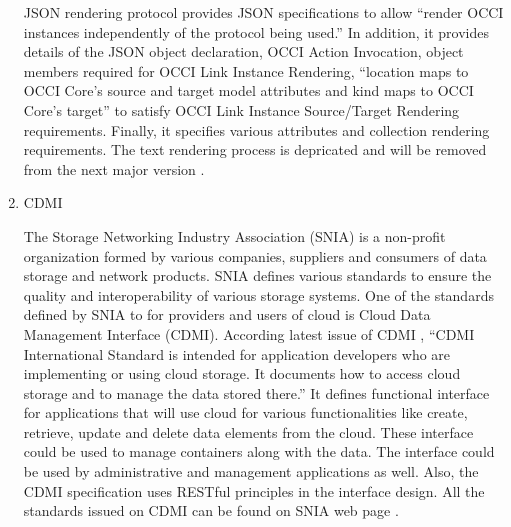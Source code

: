 \begin{enumerate}
JSON rendering  \label{\detokenize{i524/technologies:id565}}{\hyperref[\detokenize{i524/technologies:nyren-feldhaus-parak-2016}]{\sphinxcrossref{{[}485{]}}}} protocol provides
JSON specifications to allow ``render OCCI instances
independently of the protocol being used.'' In addition, it
provides details of the JSON object declaration, OCCI Action
Invocation, object members required for OCCI Link Instance
Rendering, ``location maps to OCCI Core's source and target
model attributes and kind maps to OCCI Core's target'' to
satisfy OCCI Link Instance Source/Target Rendering requirements.
Finally, it specifies various attributes and collection
rendering requirements.
The text rendering process is depricated and will be
removed from the next major version  \label{\detokenize{i524/technologies:id566}}{\hyperref[\detokenize{i524/technologies:edmonds-metsch-2016}]{\sphinxcrossref{{[}486{]}}}}.

\item {} 
CDMI

The Storage Networking Industry Association (SNIA)
\label{\detokenize{i524/technologies:id567}}{\hyperref[\detokenize{i524/technologies:www-sniawebsite}]{\sphinxcrossref{{[}487{]}}}} is a non-profit organization formed by
various companies, suppliers and consumers of data storage and
network products. SNIA defines various standards to ensure the
quality and interoperability of various storage systems. One of
the standards defined by SNIA to for providers and users of cloud
is Cloud Data Management Interface (CDMI). According latest issue
of CDMI \label{\detokenize{i524/technologies:id568}}{\hyperref[\detokenize{i524/technologies:cdmi-manual}]{\sphinxcrossref{{[}488{]}}}}, ``CDMI International Standard is
intended for application developers who are implementing or using
cloud storage. It documents how to access cloud storage and to
manage the data stored there.'' It defines functional interface
for applications that will use cloud for various functionalities
like create, retrieve, update and delete data elements from the
cloud. These interface could be used to manage containers along
with the data. The interface could be used by administrative and
management applications as well. Also, the CDMI specification
uses RESTful principles in the interface design. All the
standards issued on CDMI can be found on SNIA web page
\label{\detokenize{i524/technologies:id569}}{\hyperref[\detokenize{i524/technologies:www-cdmiwebsite}]{\sphinxcrossref{{[}489{]}}}}.


\end{enumerate}
